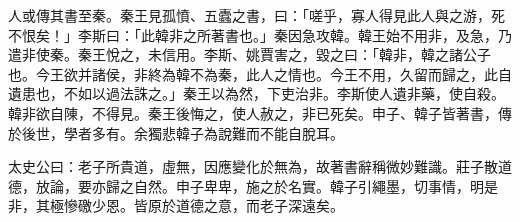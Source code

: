 \begin{pinyinscope}
人或傳其書至秦。秦王見孤憤、五蠹之書，曰：「嗟乎，寡人得見此人與之游，死不恨矣！」李斯曰：「此韓非之所著書也。」秦因急攻韓。韓王始不用非，及急，乃遣非使秦。秦王悅之，未信用。李斯、姚賈害之，毀之曰：「韓非，韓之諸公子也。今王欲并諸侯，非終為韓不為秦，此人之情也。今王不用，久留而歸之，此自遺患也，不如以過法誅之。」秦王以為然，下吏治非。李斯使人遺非藥，使自殺。韓非欲自陳，不得見。秦王後悔之，使人赦之，非已死矣。申子、韓子皆著書，傳於後世，學者多有。余獨悲韓子為說難而不能自脫耳。

太史公曰：老子所貴道，虛無，因應變化於無為，故著書辭稱微妙難識。莊子散道德，放論，要亦歸之自然。申子卑卑，施之於名實。韓子引繩墨，切事情，明是非，其極慘礉少恩。皆原於道德之意，而老子深遠矣。


\end{pinyinscope}
